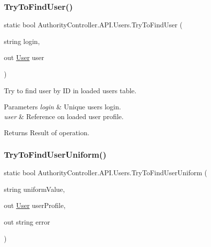 \subsubsection{\texorpdfstring{Try\+To\+Find\+User()}{TryToFindUser()}\hspace{0.1cm}{\footnotesize\ttfamily [2/2]}}
{\footnotesize\ttfamily static bool Authority\+Controller.\+A\+P\+I.\+Users.\+Try\+To\+Find\+User (\begin{DoxyParamCaption}\item[{string}]{login,  }\item[{out \mbox{\hyperlink{class_authority_controller_1_1_data_1_1_user}{User}}}]{user }\end{DoxyParamCaption})\hspace{0.3cm}{\ttfamily [static]}}



Try to find user by ID in loaded users table. 


\begin{DoxyParams}{Parameters}
{\em login} & Unique user\textquotesingle{}s login.\\
\hline
{\em user} & Reference on loaded user profile.\\
\hline
\end{DoxyParams}
\begin{DoxyReturn}{Returns}
Result of operation.
\end{DoxyReturn}
\mbox{\label{class_authority_controller_1_1_a_p_i_1_1_users_a7890ae58af943645c6b6cfc39f0d3e6f}} 
\subsubsection{\texorpdfstring{Try\+To\+Find\+User\+Uniform()}{TryToFindUserUniform()}}
{\footnotesize\ttfamily static bool Authority\+Controller.\+A\+P\+I.\+Users.\+Try\+To\+Find\+User\+Uniform (\begin{DoxyParamCaption}\item[{string}]{uniform\+Value,  }\item[{out \mbox{\hyperlink{class_authority_controller_1_1_data_1_1_user}{User}}}]{user\+Profile,  }\item[{out string}]{error }\end{DoxyParamCaption})\hspace{0.3cm}{\ttfamily [static]}}



